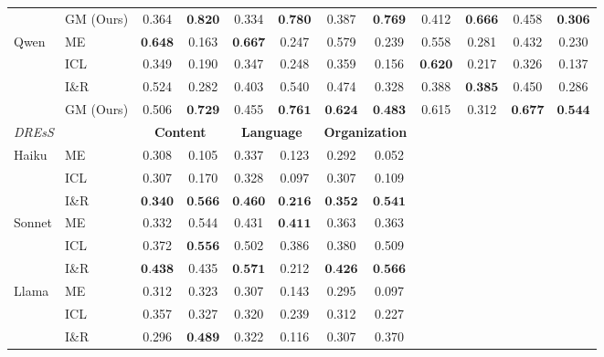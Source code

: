 \documentclass[letterpaper]{article} %
\begin{document}
\begin{table}[!htbp]
{\begin{tabular}{ll  cc  cc  cc  cc  cc}
  & GM (Ours) & 0.364 & $\textbf{0.820}$ & 0.334 & $\textbf{0.780}$ & 0.387 & $\textbf{0.769}$ & 0.412 & $\textbf{0.666}$ & 0.458 & $\textbf{0.306}$ \\
\cmidrule(l){2-12}
\multirow{4}{*}{Qwen}
  & ME       & $\textbf{0.648}$ & 0.163 & $\textbf{0.667}$ & 0.247 & 0.579 & 0.239 & 0.558 & 0.281 & 0.432 & 0.230 \\
  & ICL      & 0.349 & 0.190 & 0.347 & 0.248 & 0.359 & 0.156 & $\textbf{0.620}$ & 0.217 & 0.326 & 0.137 \\
  & I\&R     & 0.524 & 0.282 & 0.403 & 0.540 & 0.474 & 0.328 & 0.388 & $\textbf{0.385}$ & 0.450 & 0.286 \\
  & GM (Ours) & 0.506 & $\textbf{0.729}$ & 0.455 & $\textbf{0.761}$ & $\textbf{0.624}$ & $\textbf{0.483}$ & 0.615 & 0.312 & $\textbf{0.677}$ & $\textbf{0.544}$ \\
\midrule
\multicolumn{2}{l}{\textit{DREsS}}
  & \multicolumn{2}{c}{\textbf{Content}}
  & \multicolumn{2}{c}{\textbf{Language}}
  & \multicolumn{2}{c}{\textbf{Organization}}
  & \multicolumn{4}{c}{} \\
\midrule
\multirow{3}{*}{Haiku}
  & ME       & 0.308 & 0.105 & 0.337 & 0.123 & 0.292 & 0.052 & & & & \\
  & ICL      & 0.307 & 0.170 & 0.328 & 0.097 & 0.307 & 0.109 & & & & \\
  & I\&R     & $\textbf{0.340}$ & $\textbf{0.566}$ & $\textbf{0.460}$ & $\textbf{0.216}$ & $\textbf{0.352}$ & $\textbf{0.541}$ & & & & \\
\cmidrule(l){2-12}
\multirow{3}{*}{Sonnet}
  & ME       & 0.332 & 0.544 & 0.431 & $\textbf{0.411}$ & 0.363 & 0.363 & & & & \\
  & ICL      & 0.372 & $\textbf{0.556}$ & 0.502 & 0.386 & 0.380 & 0.509 & & & & \\
  & I\&R     & $\textbf{0.438}$ & 0.435 & $\textbf{0.571}$ & 0.212 & $\textbf{0.426}$ & $\textbf{0.566}$ & & & & \\
\cmidrule(l){2-12}
\multirow{4}{*}{Llama}
  & ME       & 0.312 & 0.323 & 0.307 & 0.143 & 0.295 & 0.097 & & & & \\
  & ICL      & 0.357 & 0.327 & 0.320 & 0.239 & 0.312 & 0.227 & & & & \\
  & I\&R     & 0.296 & $\textbf{0.489}$ & 0.322 & 0.116 & 0.307 & 0.370 & & & & \\

\end{tabular}}
\end{table}
\end{document}

